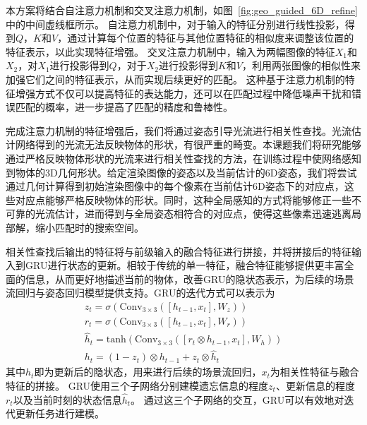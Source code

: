 \documentclass[12pt]{article}
\begin{document}
本方案将结合自注意力机制和交叉注意力机制，如图~\ref{fig:geo_guided_6D_refine}中的中间虚线框所示。
自注意力机制中，对于输入的特征分别进行线性投影，得到$Q$，$K$和$V$，通过计算每个位置的特征与其他位置特征的相似度来调整该位置的特征表示，以此实现特征增强。
交叉注意力机制中，输入为两幅图像的特征$X_1$和$X_2$，对$X_1$进行投影得到$Q$，对于$X_2$进行投影得到$K$和$V$，利用两张图像的相似性来加强它们之间的特征表示，从而实现后续更好的匹配。
这种基于注意力机制的特征增强方式不仅可以提高特征的表达能力，还可以在匹配过程中降低噪声干扰和错误匹配的概率，进一步提高了匹配的精度和鲁棒性。

完成注意力机制的特征增强后，我们将通过姿态引导光流进行相关性查找。光流估计网络得到的光流无法反映物体的形状，有很严重的畸变。本课题我们将研究能够通过严格反映物体形状的光流来进行相关性查找的方法，在训练过程中使网络感知到物体的3D几何形状。给定渲染图像的姿态以及当前估计的6D姿态，我们将尝试通过几何计算得到初始渲染图像中的每个像素在当前估计6D姿态下的对应点，这些对应点能够严格反映物体的形状。同时，这种全局感知的方式将能够修正一些不可靠的光流估计，进而得到与全局姿态相符合的对应点，使得这些像素迅速逃离局部解，缩小匹配时的搜索空间。



相关性查找后输出的特征将与前级输入的融合特征进行拼接，并将拼接后的特征输入到GRU进行状态的更新。相较于传统的单一特征，融合特征能够提供更丰富全面的信息，从而更好地描述当前的物体，改善GRU的隐状态表示，为后续的场景流回归与姿态回归模型提供支持。GRU的迭代方式可以表示为
\begin{gather}
        z_t = \sigma(\mathrm{Conv}_{3\times3}([h_{t-1}, x_t], W_z)) \\
        r_t = \sigma(\mathrm{Conv}_{3\times3}([h_{t-1}, x_t], W_r)) \\
        \hat{h}_t = \mathrm{tanh}(\mathrm{Conv}_{3\times3}([r_t \otimes h_{t-1}, x_t], W_h)) \\
        h_t = (1 - z_t)\otimes h_{t-1} + z_t \otimes \hat{h}_t
\end{gather}
其中$h_t$即为更新后的隐状态，用来进行后续的场景流回归，$x_t$为相关性特征与融合特征的拼接。
GRU使用三个子网络分别建模遗忘信息的程度$z_t$、更新信息的程度$r_t$以及当前时刻的状态信息$\hat{h}_t$。
通过这三个子网络的交互，GRU可以有效地对迭代更新任务进行建模。
\end{document}
